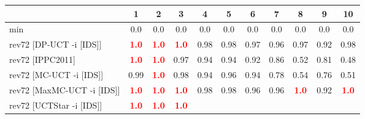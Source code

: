 \documentclass{article}
\begin{document}
\begin{tabular}{|l|r@{$\pm$}rr@{$\pm$}rr@{$\pm$}rr@{$\pm$}rr@{$\pm$}rr@{$\pm$}rr@{$\pm$}rr@{$\pm$}rr@{$\pm$}rr@{$\pm$}r|}
\hline

& \multicolumn{2}{c}{1}
& \multicolumn{2}{c}{2}
& \multicolumn{2}{c}{3}
& \multicolumn{2}{c}{4}
& \multicolumn{2}{c}{5}
& \multicolumn{2}{c}{6}
& \multicolumn{2}{c}{7}
& \multicolumn{2}{c}{8}
& \multicolumn{2}{c}{9}
& \multicolumn{2}{c|}{10}
\\
\hline
\hline
min
& \multicolumn{2}{c}{0.0}
& \multicolumn{2}{c}{0.0}
& \multicolumn{2}{c}{0.0}
& \multicolumn{2}{c}{0.0}
& \multicolumn{2}{c}{0.0}
& \multicolumn{2}{c}{0.0}
& \multicolumn{2}{c}{0.0}
& \multicolumn{2}{c}{0.0}
& \multicolumn{2}{c}{0.0}
& \multicolumn{2}{c|}{0.0}
\\
rev72 [DP-UCT -i [IDS]]
& \multicolumn{2}{c}{\textbf{\textcolor{red}{1.0}}}
& \multicolumn{2}{c}{\textbf{\textcolor{red}{1.0}}}
& \multicolumn{2}{c}{\textbf{\textcolor{red}{1.0}}}
& \multicolumn{2}{c}{0.98}
& \multicolumn{2}{c}{0.98}
& \multicolumn{2}{c}{0.97}
& \multicolumn{2}{c}{0.96}
& \multicolumn{2}{c}{0.97}
& \multicolumn{2}{c}{0.92}
& \multicolumn{2}{c|}{0.98}
\\
rev72 [IPPC2011]
& \multicolumn{2}{c}{\textbf{\textcolor{red}{1.0}}}
& \multicolumn{2}{c}{\textbf{\textcolor{red}{1.0}}}
& \multicolumn{2}{c}{0.97}
& \multicolumn{2}{c}{0.94}
& \multicolumn{2}{c}{0.94}
& \multicolumn{2}{c}{0.92}
& \multicolumn{2}{c}{0.86}
& \multicolumn{2}{c}{0.52}
& \multicolumn{2}{c}{0.81}
& \multicolumn{2}{c|}{0.48}
\\
rev72 [MC-UCT -i [IDS]]
& \multicolumn{2}{c}{0.99}
& \multicolumn{2}{c}{\textbf{\textcolor{red}{1.0}}}
& \multicolumn{2}{c}{0.98}
& \multicolumn{2}{c}{0.94}
& \multicolumn{2}{c}{0.96}
& \multicolumn{2}{c}{0.94}
& \multicolumn{2}{c}{0.78}
& \multicolumn{2}{c}{0.54}
& \multicolumn{2}{c}{0.76}
& \multicolumn{2}{c|}{0.51}
\\
rev72 [MaxMC-UCT -i [IDS]]
& \multicolumn{2}{c}{\textbf{\textcolor{red}{1.0}}}
& \multicolumn{2}{c}{\textbf{\textcolor{red}{1.0}}}
& \multicolumn{2}{c}{\textbf{\textcolor{red}{1.0}}}
& \multicolumn{2}{c}{0.98}
& \multicolumn{2}{c}{0.98}
& \multicolumn{2}{c}{0.96}
& \multicolumn{2}{c}{0.96}
& \multicolumn{2}{c}{\textbf{\textcolor{red}{1.0}}}
& \multicolumn{2}{c}{0.92}
& \multicolumn{2}{c|}{\textbf{\textcolor{red}{1.0}}}
\\
rev72 [UCTStar -i [IDS]]
& \multicolumn{2}{c}{\textbf{\textcolor{red}{1.0}}}
& \multicolumn{2}{c}{\textbf{\textcolor{red}{1.0}}}
& \multicolumn{2}{c}{\textbf{\textcolor{red}{1.0}}}

\end{tabular}
\end{document}
